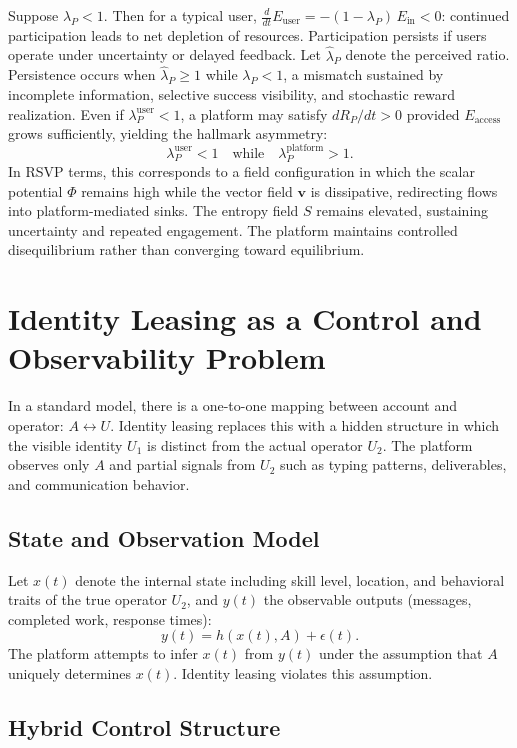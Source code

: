 \documentclass[11pt]{article}
\begin{document}
Suppose $\lambda_P < 1$. Then for a typical user,
$\frac{d}{dt} E_{\mathrm{user}} = -(1 - \lambda_P)\,E_{\mathrm{in}} < 0$:
continued participation leads to net depletion of resources. Participation
persists if users operate under uncertainty or delayed feedback. Let
$\widehat{\lambda}_P$ denote the perceived ratio. Persistence occurs when
$\widehat{\lambda}_P \geq 1$ while $\lambda_P < 1$, a mismatch sustained by
incomplete information, selective success visibility, and stochastic reward
realization. Even if $\lambda_P^{\mathrm{user}} < 1$, a platform may satisfy
$dR_P/dt > 0$ provided $E_{\mathrm{access}}$ grows sufficiently, yielding
the hallmark asymmetry:
\[
\lambda_P^{\mathrm{user}} < 1 \quad \text{while} \quad
\lambda_P^{\mathrm{platform}} > 1.
\]
In RSVP terms, this corresponds to a field configuration in which the scalar
potential $\Phi$ remains high while the vector field $\mathbf{v}$ is
dissipative, redirecting flows into platform-mediated sinks. The entropy
field $S$ remains elevated, sustaining uncertainty and repeated engagement.
The platform maintains controlled disequilibrium rather than converging
toward equilibrium.

\section{Identity Leasing as a Control and Observability Problem}
\label{sec:leasing}

In a standard model, there is a one-to-one mapping between account and
operator: $A \leftrightarrow U$. Identity leasing replaces this with a
hidden structure in which the visible identity $U_1$ is distinct from the
actual operator $U_2$. The platform observes only $A$ and partial signals
from $U_2$ such as typing patterns, deliverables, and communication behavior.

\subsection{State and Observation Model}

Let $x(t)$ denote the internal state including skill level, location, and
behavioral traits of the true operator $U_2$, and $y(t)$ the observable
outputs (messages, completed work, response times):
\[
y(t) = h(x(t), A) + \epsilon(t).
\]
The platform attempts to infer $x(t)$ from $y(t)$ under the assumption that
$A$ uniquely determines $x(t)$. Identity leasing violates this assumption.

\subsection{Hybrid Control Structure}
\end{document}
